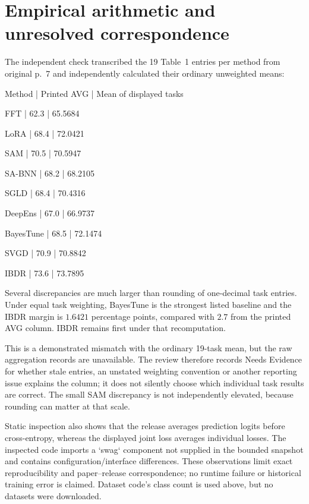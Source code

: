 \documentclass[10pt]{article}
\begin{document}
\section*{Empirical arithmetic and unresolved correspondence}
The independent check transcribed the 19 Table 1 entries per method from original p. 7 and independently calculated their ordinary unweighted means:\par
Method | Printed AVG | Mean of displayed tasks\par
FFT | 62.3 | 65.5684\par
LoRA | 68.4 | 72.0421\par
SAM | 70.5 | 70.5947\par
SA-BNN | 68.2 | 68.2105\par
SGLD | 68.4 | 70.4316\par
DeepEns | 67.0 | 66.9737\par
BayesTune | 68.5 | 72.1474\par
SVGD | 70.9 | 70.8842\par
IBDR | 73.6 | 73.7895\par
Several discrepancies are much larger than rounding of one-decimal task entries. Under equal task weighting, BayesTune is the strongest listed baseline and the IBDR margin is \(1.6421\) percentage points, compared with \(2.7\) from the printed AVG column. IBDR remains first under that recomputation.\par
This is a demonstrated mismatch with the ordinary 19-task mean, but the raw aggregation records are unavailable. The review therefore records Needs Evidence for whether stale entries, an unstated weighting convention or another reporting issue explains the column; it does not silently choose which individual task results are correct. The small SAM discrepancy is not independently elevated, because rounding can matter at that scale.\par
Static inspection also shows that the release averages prediction logits before cross-entropy, whereas the displayed joint loss averages individual losses. The inspected code imports a `swag` component not supplied in the bounded snapshot and contains configuration/interface differences. These observations limit exact reproducibility and paper–release correspondence; no runtime failure or historical training error is claimed. Dataset code’s class count is used above, but no datasets were downloaded.\par
\end{document}
